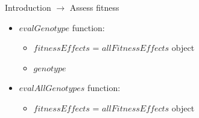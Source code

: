 \begin{frame}{Introduction $\rightarrow$ Assess fitness}

    \begin{itemize}
        \item $evalGenotype$ function:
        \begin{itemize}
            \item $fitnessEffects$ = $allFitnessEffects$ object
            \item $genotype$
        \end{itemize}
        \item $evalAllGenotypes$ function:
        \begin{itemize}
            \item $fitnessEffects$ = $allFitnessEffects$ object
        \end{itemize}
    \end{itemize}
    
\end{frame}

